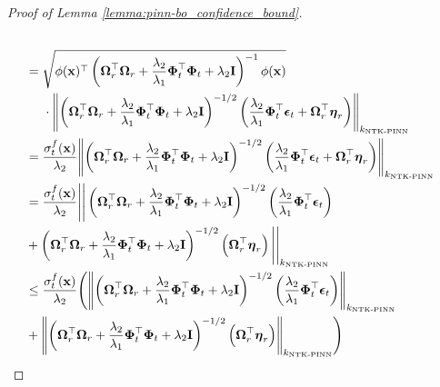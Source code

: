 \begin{proof}[Proof of Lemma \ref{lemma:pinn-bo_confidence_bound}]
\begin{align*}
\\
                & = \sqrt{\phi(\mathbf{x})^\top\left(\boldsymbol{\Omega}_r^\top \boldsymbol{\Omega}_r + \frac{\lambda_2}{\lambda_1}\boldsymbol{\Phi}_t^\top\boldsymbol{\Phi}_t + \lambda_2\mathbf{I}\right)^{-1}\phi(\mathbf{x})} \notag 
\\
                & \;\;\;\;\;  \cdot \norm{\left(\boldsymbol{\Omega}_r^\top \boldsymbol{\Omega}_r + \frac{\lambda_2}{\lambda_1}\boldsymbol{\Phi}_t^\top\boldsymbol{\Phi}_t + \lambda_2\mathbf{I}\right)^{-1/2}\left(\frac{\lambda_2}{\lambda_1}\boldsymbol{\Phi}_t^\top \boldsymbol{\epsilon}_t + \boldsymbol{\Omega}_r^\top \boldsymbol{\eta}_r \right)}_{k_\textup{NTK-PINN}}
                \\
                &=\frac{\sigma_t^f(\mathbf{x})}{\lambda_2}\norm{\left(\boldsymbol{\Omega}_r^\top \boldsymbol{\Omega}_r + \frac{\lambda_2}{\lambda_1}\boldsymbol{\Phi}_t^\top\boldsymbol{\Phi}_t + \lambda_2\mathbf{I}\right)^{-1/2}\left(\frac{\lambda_2}{\lambda_1}\boldsymbol{\Phi}_t^\top \boldsymbol{\epsilon}_t + \boldsymbol{\Omega}_r^\top \boldsymbol{\eta}_r \right)}_{k_\textup{NTK-PINN}} 
                \\
                &=\frac{\sigma_t^f(\mathbf{x})}{\lambda_2} \Bigg\lvert \Bigg\lvert\left(\boldsymbol{\Omega}_r^\top \boldsymbol{\Omega}_r + \frac{\lambda_2}{\lambda_1}\boldsymbol{\Phi}_t^\top\boldsymbol{\Phi}_t + \lambda_2\mathbf{I}\right)^{-1/2}\left(\frac{\lambda_2}{\lambda_1}\boldsymbol{\Phi}_t^\top \boldsymbol{\epsilon}_t \right) \notag \\
                & + \left(\boldsymbol{\Omega}_r^\top \boldsymbol{\Omega}_r 
                + \frac{\lambda_2}{\lambda_1}\boldsymbol{\Phi}_t^\top\boldsymbol{\Phi}_t + \lambda_2\mathbf{I}\right)^{-1/2}\left( \boldsymbol{\Omega}_r^\top \boldsymbol{\eta}_r \right) \Bigg\rvert \Bigg\lvert_{k_\textup{NTK-PINN}} 
                \\
                & \le \frac{\sigma_t^f(\mathbf{x})}{\lambda_2} \Bigg( \norm{\left(\boldsymbol{\Omega}_r^\top \boldsymbol{\Omega}_r + \frac{\lambda_2}{\lambda_1}\boldsymbol{\Phi}_t^\top\boldsymbol{\Phi}_t + \lambda_2\mathbf{I}\right)^{-1/2}\left(\frac{\lambda_2}{\lambda_1}\boldsymbol{\Phi}_t^\top \boldsymbol{\epsilon}_t \right)}_{k_\textup{NTK-PINN}} \notag \\
                & + \norm{\left(\boldsymbol{\Omega}_r^\top \boldsymbol{\Omega}_r + \frac{\lambda_2}{\lambda_1}\boldsymbol{\Phi}_t^\top\boldsymbol{\Phi}_t + \lambda_2\mathbf{I}\right)^{-1/2}\left( \boldsymbol{\Omega}_r^\top \boldsymbol{\eta}_r \right)}_{k_\textup{NTK-PINN}} \Bigg)

\end{align*}
\end{proof}
